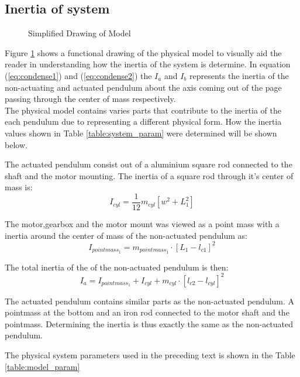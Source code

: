 \subsection{Inertia of system}
\begin{figure}[h]
	\centering
	
	\caption{Simplified Drawing of Model}
	\label{fig:model_drawing}
\end{figure}

Figure \ref{fig:model_drawing} shows a functional drawing of the physical model to visually aid the reader in understanding how the inertia of the system is determine. In equation (\ref{eq:condense1}) and (\ref{eq:condense2}) the $I_{a}$ and $I_{b}$ represents the inertia of the non-actuating and actuated pendulum about the axis coming out of the page passing through the center of mass respectively.\\

The physical model contains varies parts that contribute to the inertia of the each pendulum due to representing a different physical form. How the inertia values shown in Table \ref{table:system_param} were determined will be shown below.

The actuated pendulum consist out of a aluminium square rod connected to the shaft and the motor mounting. The inertia of a square rod through it's center of mass is: $$ I_{cyl} = \frac{1}{12}m_{cyl}[w^2+L^2_{1}]$$

The motor,gearbox and the motor mount was viewed as a point mass with a inertia around the center of mass of the non-actuated pendulum as: $$I_{pointmass_1} = m_{pointmass_1}\cdot[L_{1}-l_{c1}]^2 $$

The total inertia of the of the non-actuated pendulum is then: $$ I_{a} =I_{pointmass_1} +  I_{cyl} + m_{cyl}\cdot[l_{c2}-l_{cyl}]^2 $$

The actuated pendulum contains similar parts as the non-actuated pendulum. A pointmass at the bottom and an iron rod connected to the motor shaft and the pointmass. Determining the inertia is thus exactly the same as the non-actuated pendulum.

The physical system parameters used in the preceding text is shown in the Table \ref{table:model_param}


